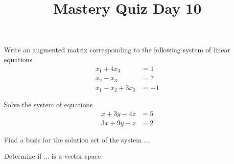 \documentclass{sbgquiz}
\title{Mastery Quiz Day 10 }
\begin{document}
\begin{problem}[E1]
Write an augmented matrix corresponding to the following system of linear equations
\begin{align*}
x_1+4x_3 &= 1 \\
x_2-x_3 &= 7 \\
x_1-x_2+3x_3 &= -1
\end{align*}
\end{problem}

\begin{problem}[E3]
Solve the system of equations
\begin{align*}
x+3y-4z &= 5 \\
3x+9y+z &= 2
\end{align*}
\end{problem}

\begin{problem}[E4]
Find a basis for the solution set of the system ...
\end{problem}

\begin{problem}[V1]
Determine if ... is a vector space
\end{problem}
\end{document}
